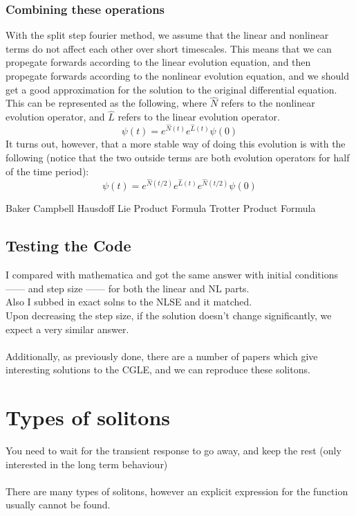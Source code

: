 \documentclass[a4paper,12pt]{report}
\begin{document}
\subsection{Combining these operations}
With the split step fourier method, we assume that the linear and nonlinear terms do not affect each other over short timescales. This means that we can propegate forwards according to the linear evolution equation, and then propegate forwards according to the nonlinear evolution equation, and we should get a good approximation for the solution to the original differential equation. This can be represented as the following, where $\hat N$ refers to the nonlinear evolution operator, and $\hat L$ refers to the linear evolution operator.
$$\psi(t)=e^{\hat N(t)}e^{\hat L(t)}\psi(0)$$ 
It turns out, however, that a more stable way of doing this evolution is with the following (notice that the two outside terms are both evolution operators for half of the time period):
$$\psi(t)=e^{\hat N(t/2)}e^{\hat L(t)}e^{\hat N(t/2)}\psi(0)$$ 


Baker Campbell Hausdoff
Lie Product Formula
Trotter Product Formula



\section{Testing the Code}
I compared with mathematica and got the same answer with initial conditions ------ and step size ------ for both the linear and NL parts.\\
Also I subbed in exact solns to the NLSE and it matched.\\
Upon decreasing the step size, if the solution doesn't change significantly, we expect a very similar answer. \\
\\
Additionally, as previously done, there are a number of papers which give interesting solutions to the CGLE, and we can reproduce these solitons.









\chapter{Types of solitons}
You need to wait for the transient response to go away, and keep the rest (only interested in the long term behaviour)
\\\\
There are many types of solitons, however an explicit expression for the function usually cannot be found. 
\end{document}
